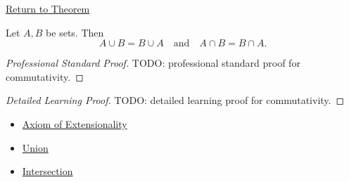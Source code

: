 \newpage
{}
\label{prf:commutativity}

\begin{remark*}[Return]
\hyperref[thm:commutativity]{Return to Theorem}
\end{remark*}

\begin{theorem*}
Let $A,B$ be sets. Then
\[
A \cup B = B \cup A
\quad\text{and}\quad
A \cap B = B \cap A.
\]
\end{theorem*}

\begin{proof}[Professional Standard Proof]
\LRAProofBodyStart
TODO: professional standard proof for commutativity.
\end{proof}

\begin{proof}[Detailed Learning Proof]
\LRAProofBodyStart
TODO: detailed learning proof for commutativity.
\end{proof}

\begin{remark*}
\end{remark*}

\begin{dependencies}
\begin{itemize}
  \item \hyperref[ax:extensionality]{Axiom of Extensionality}
  \item \hyperref[def:union]{Union}
  \item \hyperref[def:intersection]{Intersection}
\end{itemize}
\end{dependencies}

\clearpage
